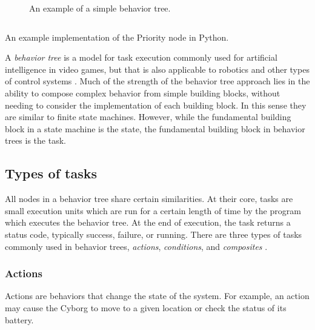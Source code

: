 \documentclass[\rootfolder/main.tex]{subfiles}
\begin{document}
\begin{wrapfigure}{L}{0.5\columnwidth}
    \caption{An example of a simple behavior tree.}
    \label{fig:bt}
\end{wrapfigure}

\begin{listing}
    \inputminted{python}{\rootfolder/Chapters/Chapter2/Listings/priority.py}
    \caption{An example implementation of the Priority node in Python.\label{lst:priority}}
\end{listing}

A \emph{behavior tree} is a model for task execution commonly used for artificial intelligence in video games, but that is also applicable to robotics and other types of control systems \cite{Millington2009}.
Much of the strength of the behavior tree approach lies in the ability to compose complex behavior from simple building blocks, without needing to consider the implementation of each building block.
In this sense they are similar to finite state machines.
However, while the fundamental building block in a state machine is the state, the fundamental building block in behavior trees is the task.


\subsection{Types of tasks}

All nodes in a behavior tree share certain similarities.
At their core, tasks are small execution units which are run for a certain length of time by the program which executes the behavior tree.
At the end of execution, the task returns a status code, typically success, failure, or running.
There are three types of tasks commonly used in behavior trees, \emph{actions}, \emph{conditions}, and \emph{composites} \cite{Millington2009}.

\subsubsection{Actions}

Actions are behaviors that change the state of the system.
For example, an action may cause the Cyborg to move to a given location or check the status of its battery.
\end{document}
